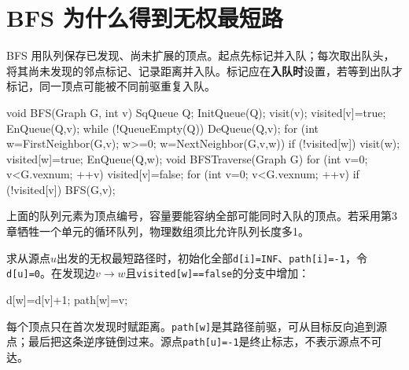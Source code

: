 \section{BFS 为什么得到无权最短路}\label{DS06-05}

BFS 用队列保存已发现、尚未扩展的顶点。起点先标记并入队；每次取出队头，将其尚未发现的邻点标记、记录距离并入队。标记应在\textbf{入队时}设置，若等到出队才标记，同一顶点可能被不同前驱重复入队。

\par\medskip\noindent\begin{minipage}{\linewidth}
\begin{codeblock}[language=C++]
void BFS(Graph G, int v) {
    SqQueue Q;
    InitQueue(Q);
    visit(v);
    visited[v]=true;
    EnQueue(Q,v);
    while (!QueueEmpty(Q)) {
        DeQueue(Q,v);
        for (int w=FirstNeighbor(G,v); w>=0;
             w=NextNeighbor(G,v,w)) {
            if (!visited[w]) {
                visit(w);
                visited[w]=true;
                EnQueue(Q,w);
            }
        }
    }
}
void BFSTraverse(Graph G) {
    for (int v=0; v<G.vexnum; ++v) visited[v]=false;
    for (int v=0; v<G.vexnum; ++v)
        if (!visited[v]) BFS(G,v);
}
\end{codeblock}
\end{minipage}\par\medskip

上面的队列元素为顶点编号，容量要能容纳全部可能同时入队的顶点。若采用第3章牺牲一个单元的循环队列，物理数组须比允许队列长度多1。

求从源点\(u\)出发的无权最短路径时，初始化全部\texttt{d[\allowbreak{}i]\allowbreak{}=\allowbreak{}INF}、\texttt{path[\allowbreak{}i]\allowbreak{}=\allowbreak{}-1}，令\texttt{d[\allowbreak{}u]\allowbreak{}=\allowbreak{}0}。在发现边\(v\to w\)且\texttt{visited[\allowbreak{}w]\allowbreak{}=\allowbreak{}=\allowbreak{}false}的分支中增加：

\par\medskip\noindent\begin{minipage}{\linewidth}
\begin{codeblock}[language=C++]
d[w]=d[v]+1;
path[w]=v;
\end{codeblock}
\end{minipage}\par\medskip

每个顶点只在首次发现时赋距离。\texttt{path[\allowbreak{}w]\allowbreak{}}是其路径前驱，可从目标反向追到源点；最后把这条逆序链倒过来。源点\texttt{path[\allowbreak{}u]\allowbreak{}=\allowbreak{}-1}是终止标志，不表示源点不可达。

